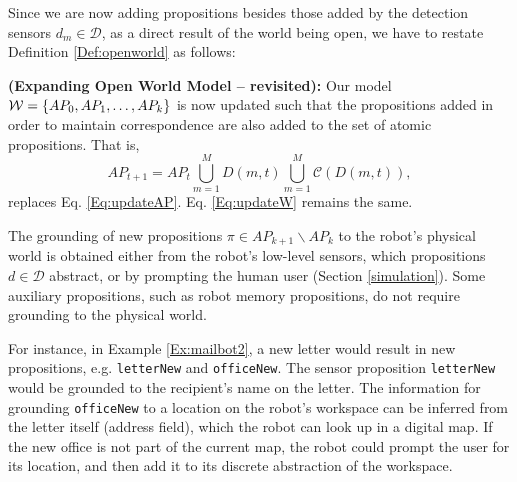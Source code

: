 Since we are now adding propositions besides those added by the detection sensors $d_m \in \mathcal{D}$, as a direct result of the world being open, we have to restate Definition \ref{Def:openworld} as follows:

\begin{myDefinition}\label{Def:openworld2}	
	\textbf{(Expanding Open World Model -- revisited):} Our model $\mathcal{W} = \left\{ AP_0, AP_1, \ldots, AP_k \right\}$ is now updated such that the propositions added in order to maintain correspondence are also added to the set of atomic propositions. That is, 
	\begin{equation}\label{Eq:updateAP2}
		AP_{t+1} = AP_t \bigcup_{m=1}^{M}D(m, t) \bigcup_{m=1}^{M}\mathcal{C}(D(m, t)),
	\end{equation}
	replaces Eq. \eqref{Eq:updateAP}. Eq. \eqref{Eq:updateW} remains the same.
\end{myDefinition}

\begin{myAssumption}
	The grounding \cite{Grounding2013} of new propositions 
$\pi \in AP_{k+1} \backslash AP_k$ to the robot's physical world is obtained either from the robot's low-level sensors, which propositions $d \in \mathcal{D}$ abstract, or by prompting the human user (Section \ref{simulation}).
Some auxiliary propositions, such as robot memory propositions, do not require grounding to the physical world.
\end{myAssumption}

For instance, in Example \ref{Ex:mailbot2}, a new letter would result in new propositions, e.g. \texttt{letterNew} and \texttt{officeNew}. The sensor proposition \texttt{letterNew} would be grounded to the recipient's name on the letter. The information for grounding \texttt{officeNew} to a location on the robot's workspace can be inferred from the letter itself (address field), which the robot can look up in a digital map. If the new office is not part of the current map, the robot could prompt the user for its location, and then add it to its discrete abstraction of the workspace.


